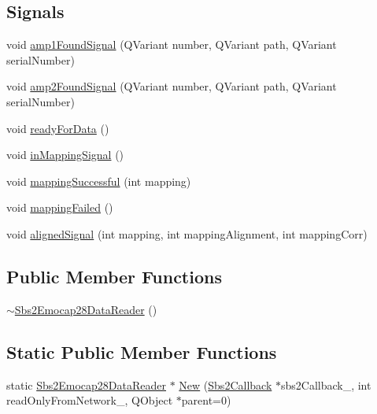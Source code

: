 \subsection*{Signals}
\begin{DoxyCompactItemize}
\item 
void \hyperlink{classSbs2Emocap28DataReader_a90da90e617c1b65bea974ad632bfe6dc}{amp1\-Found\-Signal} (Q\-Variant number, Q\-Variant path, Q\-Variant serial\-Number)
\item 
void \hyperlink{classSbs2Emocap28DataReader_ae66309bad3418ff624b97d4fe964a4bc}{amp2\-Found\-Signal} (Q\-Variant number, Q\-Variant path, Q\-Variant serial\-Number)
\item 
void \hyperlink{classSbs2Emocap28DataReader_a8a34d2659ebb064fd9dfbbeb8e885f41}{ready\-For\-Data} ()
\item 
void \hyperlink{classSbs2Emocap28DataReader_a768d1a019c7c5f491161e733a2b0282a}{in\-Mapping\-Signal} ()
\item 
void \hyperlink{classSbs2Emocap28DataReader_aea641bcfd2e46b07c9025fc2a05cabf8}{mapping\-Successful} (int mapping)
\item 
void \hyperlink{classSbs2Emocap28DataReader_a8ffaf86ba99e47b332afe46805567374}{mapping\-Failed} ()
\item 
void \hyperlink{classSbs2Emocap28DataReader_a1ccc02a646e7bbac4752bb4544aea6a3}{aligned\-Signal} (int mapping, int mapping\-Alignment, int mapping\-Corr)
\end{DoxyCompactItemize}
\subsection*{Public Member Functions}
\begin{DoxyCompactItemize}
\item 
\hyperlink{classSbs2Emocap28DataReader_a8ccc336f89762cef94be3cb1d2ad7b7a}{$\sim$\-Sbs2\-Emocap28\-Data\-Reader} ()
\end{DoxyCompactItemize}
\subsection*{Static Public Member Functions}
\begin{DoxyCompactItemize}
\item 
static \hyperlink{classSbs2Emocap28DataReader}{Sbs2\-Emocap28\-Data\-Reader} $\ast$ \hyperlink{classSbs2Emocap28DataReader_ae4370297a7212086bc8f5c1e452c769d}{New} (\hyperlink{classSbs2Callback}{Sbs2\-Callback} $\ast$sbs2\-Callback\-\_\-, int read\-Only\-From\-Network\-\_, Q\-Object $\ast$parent=0)
\end{DoxyCompactItemize}
